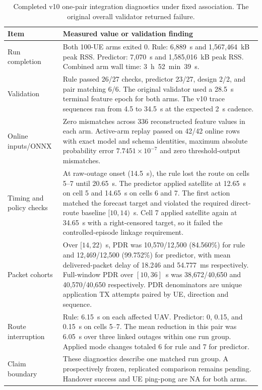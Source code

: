 \begin{table}[t]
\begin{tabular}{p{} p{} p{}}
\hline
\end{tabular}
\end{table}

\begin{table}[t]
\centering
\footnotesize
\caption{Completed v10 one-pair integration diagnostics under fixed association. The original overall validator returned failure.}
\label{tab:audited_v10_diagnostics}
\begin{tabular}{p{} p{}}
\hline
Item & Measured value or validation finding \\
\hline
Run completion & Both 100-UE arms exited 0. Rule: 6,889~s and 1,567,464~kB peak RSS. Predictor: 7,070~s and 1,585,016~kB peak RSS. Combined arm wall time: 3~h~52~min~39~s. \\
Validation & Rule passed 26/27 checks, predictor 23/27, design 2/2, and pair matching 6/6. The original validator used a 28.5~s terminal feature epoch for both arms. The v10 trace sequences ran from 4.5 to 34.5~s at the expected 2~s cadence. \\
Online inputs/ONNX & Zero mismatches across 336 reconstructed feature values in each arm. Active-arm replay passed on 42/42 online rows with exact model and schema identities, maximum absolute probability error $7.7451\times10^{-7}$ and zero threshold-output mismatches. \\
Timing and policy checks & At raw-outage onset (14.5~s), the rule lost the route on cells 5--7 until 20.65~s. The predictor applied satellite at 12.65~s on cell 5 and 14.65~s on cells 6 and 7. The first action matched the forecast target and violated the required direct-route baseline $[10,14)$~s. Cell 7 applied satellite again at 34.65~s with a right-censored target, so it failed the controlled-episode linkage requirement. \\
Packet cohorts & Over $[14,22)$~s, PDR was 10,570/12,500 (84.560\%) for rule and 12,469/12,500 (99.752\%) for predictor, with mean delivered-packet delay of 18.246 and 54.777~ms respectively. Full-window PDR over $[10,36]$~s was 38,672/40,650 and 40,570/40,650 respectively. PDR denominators are unique application TX attempts paired by UE, direction and sequence. \\
Route interruption & Rule: 6.15~s on each affected UAV. Predictor: 0, 0.15, and 0.15~s on cells 5--7. The mean reduction in this pair was 6.05~s over three linked outages within one run group. Applied mode changes totaled 6 for rule and 7 for predictor. \\
Claim boundary & These diagnostics describe one matched run group. A prospectively frozen, replicated comparison remains pending. Handover success and UE ping-pong are NA for both arms. \\
\hline
\end{tabular}
\end{table}

